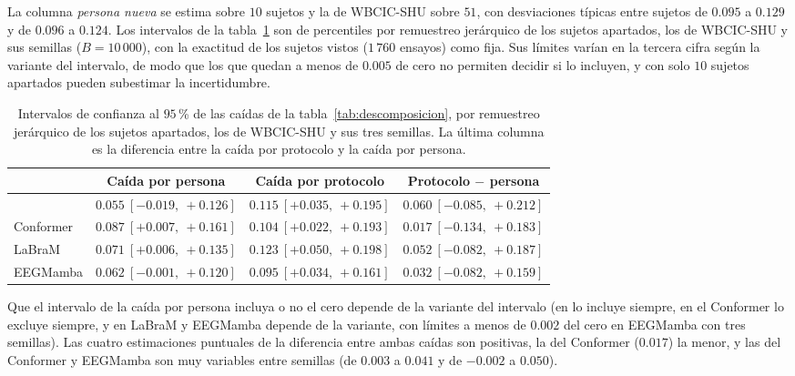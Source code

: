 La columna \emph{persona nueva} se estima sobre $10$ sujetos y la de WBCIC-SHU sobre $51$, con desviaciones
típicas entre sujetos de $0.095$ a $0.129$ y de $0.096$ a $0.124$. Los intervalos de la
tabla~\ref{tab:descomposicion-ic} son de percentiles por remuestreo jerárquico de los sujetos apartados, los
de WBCIC-SHU y sus semillas ($B = 10\,000$), con la exactitud de los sujetos vistos ($1\,760$ ensayos)
como fija. Sus límites varían en la tercera cifra según la variante del intervalo, de modo que los que
quedan a menos de $0.005$ de cero no permiten decidir si lo incluyen, y con solo $10$ sujetos apartados
pueden subestimar la incertidumbre.

\begin{table}[H]
\centering
\caption{Intervalos de confianza al $95$\,\% de las caídas de la
tabla~\ref{tab:descomposicion}, por remuestreo jerárquico de los sujetos apartados, los de
WBCIC-SHU y sus tres semillas. La última columna es la diferencia entre la caída por protocolo y la caída por
persona.}
\label{tab:descomposicion-ic}
\footnotesize
\setlength{\tabcolsep}{4pt}
\begin{tabular}{lccc}
\toprule
 & \textbf{Caída por persona} & \textbf{Caída por protocolo} & \textbf{Protocolo $-$ persona} \\
\midrule
\eegnet{} & $0.055\ [-0.019,\ +0.126]$ & $0.115\ [+0.035,\ +0.195]$ & $0.060\ [-0.085,\ +0.212]$ \\
Conformer & $0.087\ [+0.007,\ +0.161]$ & $0.104\ [+0.022,\ +0.193]$ & $0.017\ [-0.134,\ +0.183]$ \\
LaBraM & $0.071\ [+0.006,\ +0.135]$ & $0.123\ [+0.050,\ +0.198]$ & $0.052\ [-0.082,\ +0.187]$ \\
EEGMamba & $0.062\ [-0.001,\ +0.120]$ & $0.095\ [+0.034,\ +0.161]$ & $0.032\ [-0.082,\ +0.159]$ \\
\bottomrule
\end{tabular}
\end{table}

Que el intervalo de la caída por persona incluya o no el cero depende de la variante del intervalo (en
\eegnet{} lo incluye siempre, en el Conformer lo excluye siempre, y en LaBraM y EEGMamba depende de la
variante, con límites a menos de $0.002$ del cero en EEGMamba con tres semillas). Las cuatro estimaciones
puntuales de la diferencia entre ambas caídas son positivas, la del Conformer ($0.017$) la menor, y las del
Conformer y EEGMamba son muy variables entre semillas (de $0.003$ a $0.041$ y de $-0.002$ a $0.050$).


